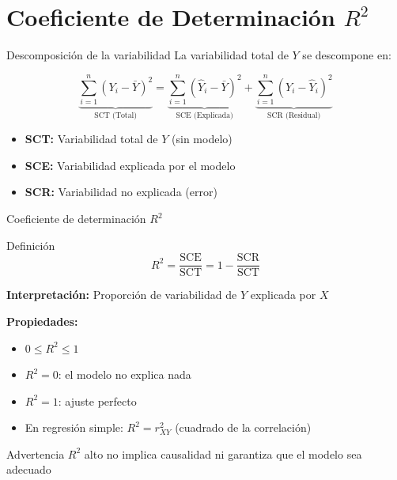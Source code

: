 \documentclass[aspectratio=169]{beamer}
\begin{document}
\section{Coeficiente de Determinación $R^2$}

\begin{frame}{Descomposición de la variabilidad}
La variabilidad total de $Y$ se descompone en:

\[
\underbrace{\sum_{i=1}^{n} (Y_i - \bar{Y})^2}_{\text{SCT (Total)}} = \underbrace{\sum_{i=1}^{n} (\hat{Y}_i - \bar{Y})^2}_{\text{SCE (Explicada)}} + \underbrace{\sum_{i=1}^{n} (Y_i - \hat{Y}_i)^2}_{\text{SCR (Residual)}}
\]

\vspace{0.5cm}
\begin{itemize}
    \item \textbf{SCT:} Variabilidad total de $Y$ (sin modelo)
    \item \textbf{SCE:} Variabilidad explicada por el modelo
    \item \textbf{SCR:} Variabilidad no explicada (error)
\end{itemize}
\end{frame}

\begin{frame}{Coeficiente de determinación $R^2$}
\begin{block}{Definición}
\[
R^2 = \frac{\text{SCE}}{\text{SCT}} = 1 - \frac{\text{SCR}}{\text{SCT}}
\]
\end{block}

\textbf{Interpretación:} Proporción de variabilidad de $Y$ explicada por $X$

\vspace{0.5cm}
\textbf{Propiedades:}
\begin{itemize}
    \item $0 \leq R^2 \leq 1$
    \item $R^2 = 0$: el modelo no explica nada
    \item $R^2 = 1$: ajuste perfecto
    \item En regresión simple: $R^2 = r_{XY}^2$ (cuadrado de la correlación)
\end{itemize}

\vspace{0.3cm}
\begin{alertblock}{Advertencia}
$R^2$ alto no implica causalidad ni garantiza que el modelo sea adecuado
\end{alertblock}
\end{frame}
\end{document}
